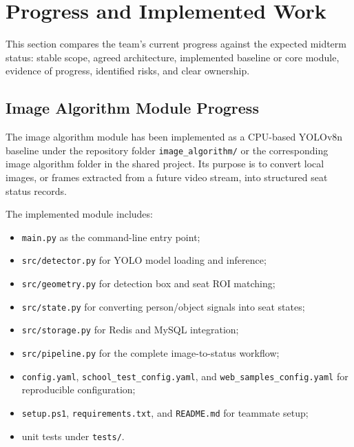 \section{Progress and Implemented Work}

This section compares the team's current progress against the expected midterm status: stable scope, agreed architecture, implemented baseline or core module, evidence of progress, identified risks, and clear ownership.



\subsection{Image Algorithm Module Progress}

The image algorithm module has been implemented as a CPU-based YOLOv8n baseline under the repository folder \texttt{image\_algorithm/} or the corresponding image algorithm folder in the shared project. Its purpose is to convert local images, or frames extracted from a future video stream, into structured seat status records.

The implemented module includes:

\begin{itemize}
  \item \texttt{main.py} as the command-line entry point;
  \item \texttt{src/detector.py} for YOLO model loading and inference;
  \item \texttt{src/geometry.py} for detection box and seat ROI matching;
  \item \texttt{src/state.py} for converting person/object signals into seat states;
  \item \texttt{src/storage.py} for Redis and MySQL integration;
  \item \texttt{src/pipeline.py} for the complete image-to-status workflow;
  \item \texttt{config.yaml}, \texttt{school\_test\_config.yaml}, and \texttt{web\_samples\_config.yaml} for reproducible configuration;
  \item \texttt{setup.ps1}, \texttt{requirements.txt}, and \texttt{README.md} for teammate setup;
  \item unit tests under \texttt{tests/}.
\end{itemize}

